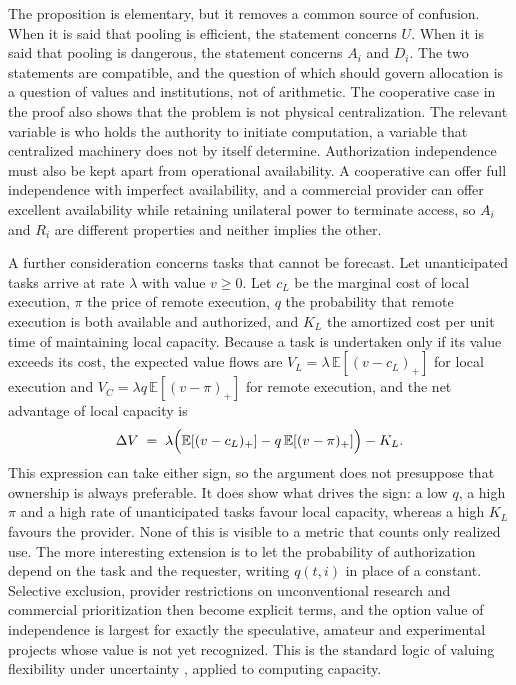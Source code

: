 \documentclass[11pt]{article}
\theoremstyle{plain}
\theoremstyle{definition}
\begin{document}
The proposition is elementary, but it removes a common source of confusion. When it is said that pooling is efficient, the statement concerns $U$. When it is said that pooling is dangerous, the statement concerns $A_i$ and $D_i$. The two statements are compatible, and the question of which should govern allocation is a question of values and institutions, not of arithmetic. The cooperative case in the proof also shows that the problem is not physical centralization. The relevant variable is who holds the authority to initiate computation, a variable that centralized machinery does not by itself determine. Authorization independence must also be kept apart from operational availability. A cooperative can offer full independence with imperfect availability, and a commercial provider can offer excellent availability while retaining unilateral power to terminate access, so $A_i$ and $R_i$ are different properties and neither implies the other.

A further consideration concerns tasks that cannot be forecast. Let unanticipated tasks arrive at rate $\lambda$ with value $v\ge 0$. Let $c_L$ be the marginal cost of local execution, $\pi$ the price of remote execution, $q$ the probability that remote execution is both available and authorized, and $K_L$ the amortized cost per unit time of maintaining local capacity. Because a task is undertaken only if its value exceeds its cost, the expected value flows are $V_L=\lambda\,\mathbb{E}[(v-c_L)_+]$ for local execution and $V_C=\lambda q\,\mathbb{E}[(v-\pi)_+]$ for remote execution, and the net advantage of local capacity is
\[
\Delta V \;=\; \lambda\Bigl(\mathbb{E}[(v-c_L)_+]-q\,\mathbb{E}[(v-\pi)_+]\Bigr)-K_L.
\]
This expression can take either sign, so the argument does not presuppose that ownership is always preferable. It does show what drives the sign: a low $q$, a high $\pi$ and a high rate of unanticipated tasks favour local capacity, whereas a high $K_L$ favours the provider. None of this is visible to a metric that counts only realized use. The more interesting extension is to let the probability of authorization depend on the task and the requester, writing $q(t,i)$ in place of a constant. Selective exclusion, provider restrictions on unconventional research and commercial prioritization then become explicit terms, and the option value of independence is largest for exactly the speculative, amateur and experimental projects whose value is not yet recognized. This is the standard logic of valuing flexibility under uncertainty \cite{dixit}, applied to computing capacity.
\end{document}
